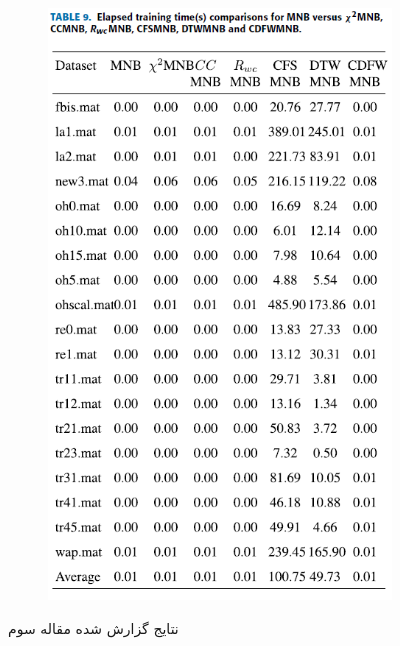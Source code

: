 \documentclass[12pt, a4paper]{article}
\begin{document}
\begin{figure}
\begin{subfigure}{0.45\linewidth}
        \includegraphics[width=\linewidth]{images/article3/table9.png}
        \caption{}
        \label{a3_table9}
    \end{subfigure}
    \caption{نتایج گزارش شده مقاله سوم}
    \label{a3_results}
\end{figure}
\end{document}
